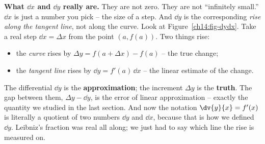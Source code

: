 \begin{happeningbox}
\textbf{What $\dd x$ and $\dd y$ really are.} They are not zero. They are not
``infinitely small.'' $\dd x$ is just a number you pick -- the size of a step.
And $\dd y$ is the corresponding \emph{rise along the tangent line}, not along the
curve. Look at Figure~\ref{ch14:fig-dydx}. Take a real step $\dd x = \Delta x$
from the point $(a,f(a))$. Two things rise:
\begin{itemize}
\item the \emph{curve} rises by $\Delta y = f(a+\Delta x) - f(a)$ -- the true
change;
\item the \emph{tangent line} rises by $\dd y = f'(a)\,\dd x$ -- the linear
estimate of the change.
\end{itemize}
The differential $\dd y$ is the \textbf{approximation}; the increment $\Delta y$
is the \textbf{truth}. The gap between them, $\Delta y - \dd y$, is the error of
linear approximation -- exactly the quantity we studied in the last section. And
now the notation $\dv{y}{x}=f'(x)$ is literally a quotient of two numbers $\dd y$
and $\dd x$, because that is how we defined $\dd y$. Leibniz's fraction was real
all along; we just had to say which line the rise is measured on.
\end{happeningbox}

